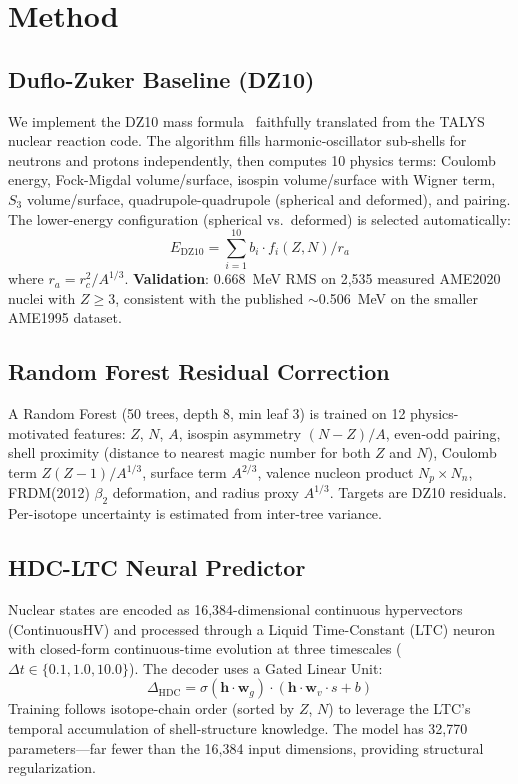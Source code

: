 \documentclass[twocolumn,letterpaper,10pt]{article}
\begin{document}
\section{Method}

\subsection{Duflo-Zuker Baseline (DZ10)}

We implement the DZ10 mass formula~\cite{duflo1995} faithfully translated
from the TALYS nuclear reaction code. The algorithm fills harmonic-oscillator
sub-shells for neutrons and protons independently, then computes 10 physics
terms: Coulomb energy, Fock-Migdal volume/surface, isospin volume/surface
with Wigner term, $S_3$ volume/surface, quadrupole-quadrupole (spherical and
deformed), and pairing. The lower-energy configuration (spherical vs.\
deformed) is selected automatically:
\begin{equation}
E_\text{DZ10} = \sum_{i=1}^{10} b_i \cdot f_i(Z, N) / r_a
\end{equation}
where $r_a = r_c^2 / A^{1/3}$. \textbf{Validation}: 0.668~MeV RMS on
2,535 measured AME2020 nuclei with $Z \geq 3$, consistent with the
published $\sim$0.506~MeV on the smaller AME1995 dataset.

\subsection{Random Forest Residual Correction}

A Random Forest (50 trees, depth 8, min leaf 3) is trained on 12
physics-motivated features: $Z$, $N$, $A$, isospin asymmetry $(N{-}Z)/A$,
even-odd pairing, shell proximity (distance to nearest magic number for
both $Z$ and $N$), Coulomb term $Z(Z{-}1)/A^{1/3}$, surface term
$A^{2/3}$, valence nucleon product $N_p \times N_n$, FRDM(2012) $\beta_2$
deformation, and radius proxy $A^{1/3}$. Targets are DZ10 residuals.
Per-isotope uncertainty is estimated from inter-tree variance.

\subsection{HDC-LTC Neural Predictor}

Nuclear states are encoded as 16,384-dimensional continuous hypervectors
(ContinuousHV) and processed through a Liquid Time-Constant (LTC) neuron
with closed-form continuous-time evolution at three timescales
($\Delta t \in \{0.1, 1.0, 10.0\}$). The decoder uses a Gated Linear Unit:
\begin{equation}
\Delta_\text{HDC} = \sigma(\mathbf{h} \cdot \mathbf{w}_g) \cdot
(\mathbf{h} \cdot \mathbf{w}_v \cdot s + b)
\end{equation}
Training follows isotope-chain order (sorted by $Z$, $N$) to leverage the
LTC's temporal accumulation of shell-structure knowledge. The model has
32,770 parameters---far fewer than the 16,384 input dimensions, providing
structural regularization.
\end{document}
